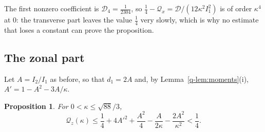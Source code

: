 \documentclass[aps,prd,twocolumn,superscriptaddress,nofootinbib,longbibliography,floatfix,amsmath,amssymb,10pt]{revtex4-2}
\newtheorem{proposition}[theorem]{Proposition}
\theoremstyle{definition}
\theoremstyle{remark}
\begin{document}
The first nonzero coefficient is $\mathcal D_4=\frac1{2304}$, so
$\frac14-\mathcal Q_x=\mathcal D/(12\kappa^2I_1^2)$ is of order $\kappa^4$ at $0$: the transverse part
leaves the value $\frac14$ very slowly, which is why no estimate that loses a
constant can prove the proposition.

\subsection{The zonal part}

Let $A=I_2/I_1$ as before, so that $d_1=2A$ and, by
Lemma~\ref{q-lem:moments}(i), $A'=1-A^2-3A/\kappa$.

\begin{proposition}\label{q-prop:zonal}
For $0<\kappa\le\sqrt{88}/3$,
\[
\mathcal Q_z(\kappa)\le\frac14+4A'^2+\frac{A^2}4-\frac A{2\kappa}-
\frac{2A^2}{\kappa^2}<\frac14 .
\]
\end{proposition}
\end{document}

